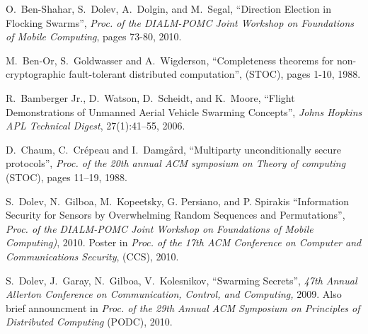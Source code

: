 \documentclass[letterpaper,11pt]{article}
\newcommand{\ignore}[1]{}
               {}
\begin{document}
\ignore{
\subsection{Minimizing the number of the seeds}
\todo{VLAD: this sect. needs to be reworked}
In the first scheme which was described in \ref{sec-from-all}, as the seed distribution we used a clique on  vertices . In total we needed  seeds. 
An interesting question is, are we able to minimize our number of seeds. By proposition \ref{prop-privacy}, in the first scheme, if we know that our adversary can catch at most  agents, then a -regular graph would be enough and will be necessary. Such a graph will have  edges.
What can we say about the second scheme?
}


{\small

\begin{thebibliography}{99}

 O.\ Ben-Shahar, S.\ Dolev, A.\ Dolgin, and M.\ Segal,
\newblock ``Direction Election in Flocking Swarms'', 
\newblock \textit{Proc. of the DIALM-POMC Joint Workshop on Foundations of Mobile Computing}, pages 73-80, 2010.


M.\ Ben-Or, S.\ Goldwasser and A.\ Wigderson,
\newblock ``Completeness theorems for non-cryptographic fault-tolerant distributed computation'',
 (STOC), pages 1-10, 1988.

R.\ Bamberger Jr., D.\ Watson, D.\ Scheidt, and K.\ Moore,
``Flight Demonstrations of Unmanned Aerial Vehicle Swarming Concepts'',
{\em Johns Hopkins APL Technical Digest}, 27(1):41--55, 2006.

 D.\ Chaum, C.\ Cr\'{e}peau and I.\ Damg{\aa}rd,
``Multiparty unconditionally secure protocols'', {\it Proc. of the 20th annual ACM symposium on Theory of computing} (STOC), pages 11--19, 1988.

S.\ Dolev, N.\ Gilboa, M.\ Kopeetsky, G. Persiano, and P. Spirakis ``Information Security for
Sensors by Overwhelming Random Sequences and Permutations'', \textit{Proc. of the DIALM-POMC Joint Workshop on Foundations of Mobile Computing)}, 2010. Poster in \textit{Proc. of the 17th ACM Conference on Computer and Communications Security}, (CCS), 2010.

S.\ Dolev, J.\ Garay, N.\ Gilboa, V.\ Kolesnikov,
``Swarming Secrets'',
{\it 47th Annual Allerton Conference on Communication, Control, and Computing,}
2009. Also brief announcment in {\it Proc. of the 29th Annual ACM Symposium on Principles of Distributed Computing} (PODC), 2010.


\end{thebibliography}}
\end{document}
